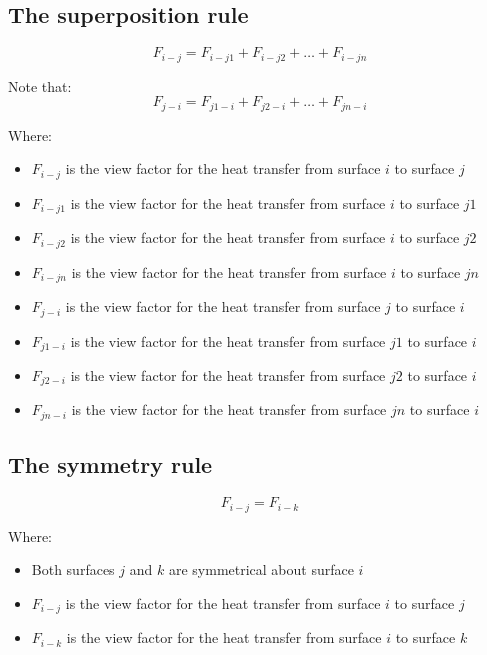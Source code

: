 \documentclass[11pt]{article}
\begin{document}
 \newpage

\subsection{The superposition rule}
\label{sec:org04161ff}
\[F_{i-j} = F_{i-j1} + F_{i-j2} + \ldots + F_{i-jn}\]

Note that:
\[F_{j-i} = F_{j1-i} + F_{j2-i} + \ldots + F_{jn-i}\]

Where:
\begin{itemize}
\item \(F_{i-j}\) is the view factor for the heat transfer from surface \(i\) to surface \(j\)
\item \(F_{i-j1}\) is the view factor for the heat transfer from surface \(i\) to surface \(j1\)
\item \(F_{i-j2}\) is the view factor for the heat transfer from surface \(i\) to surface \(j2\)
\item \(F_{i-jn}\) is the view factor for the heat transfer from surface \(i\) to surface \(jn\)
\item \(F_{j-i}\) is the view factor for the heat transfer from surface \(j\) to surface \(i\)
\item \(F_{j1-i}\) is the view factor for the heat transfer from surface \(j1\) to surface \(i\)
\item \(F_{j2-i}\) is the view factor for the heat transfer from surface \(j2\) to surface \(i\)
\item \(F_{jn-i}\) is the view factor for the heat transfer from surface \(jn\) to surface \(i\)
\end{itemize}

 \newpage

\subsection{The symmetry rule}
\label{sec:org5c455c5}
\[F_{i-j} = F_{i-k}\]

Where:
\begin{itemize}
\item Both surfaces \(j\) and \(k\) are symmetrical about surface \(i\)
\item \(F_{i-j}\) is the view factor for the heat transfer from surface \(i\) to surface \(j\)
\item \(F_{i-k}\) is the view factor for the heat transfer from surface \(i\) to surface \(k\)
\end{itemize}
\end{document}
